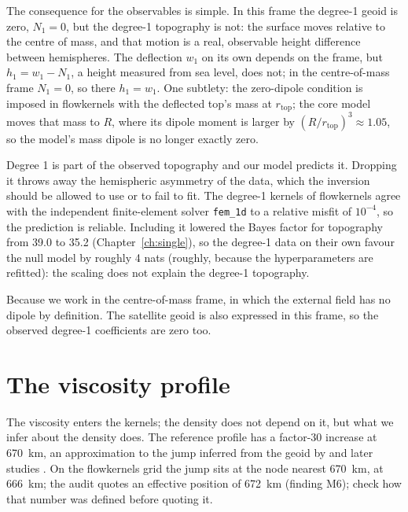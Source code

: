 The consequence for the observables is simple.
In this frame the degree-1 geoid is zero, $N_1=0$, but the degree-1 topography is not: the surface moves relative to the centre of mass, and that motion is a real, observable height difference between hemispheres.
The deflection $w_1$ on its own depends on the frame, but $h_1 = w_1 - N_1$, a height measured from sea level, does not; in the centre-of-mass frame $N_1=0$, so there $h_1=w_1$.
One subtlety: the zero-dipole condition is imposed in flowkernels with the deflected top's mass at $r_{\mathrm{top}}$; the core model moves that mass to $R$, where its dipole moment is larger by $(R/r_{\mathrm{top}})^3\approx1.05$, so the model's mass dipole is no longer exactly zero.

\begin{defence}
\A Degree 1 is part of the observed topography and our model predicts it.
Dropping it throws away the hemispheric asymmetry of the data, which the inversion should be allowed to use or to fail to fit.
The degree-1 kernels of flowkernels agree with the independent finite-element solver \texttt{fem\_1d} to a relative misfit of $10^{-4}$, so the prediction is reliable.
Including it lowered the Bayes factor for topography from 39.0 to 35.2 (Chapter~\ref{ch:single}), so the degree-1 data on their own favour the null model by roughly 4 nats (roughly, because the hyperparameters are refitted): the scaling does not explain the degree-1 topography.

\A Because we work in the centre-of-mass frame, in which the external field has no dipole by definition.
The satellite geoid is also expressed in this frame, so the observed degree-1 coefficients are zero too.
\end{defence}

\section{The viscosity profile}

The viscosity enters the kernels; the density does not depend on it, but what we infer about the density does.
The reference profile has a factor-30 increase at \qty{670}{km}, an approximation to the jump inferred from the geoid by \citet{hager_lower_1985} and later studies \citep{king_masters_1992,rudolph_2015}.
On the flowkernels grid the jump sits at the node nearest \qty{670}{km}, at \qty{666}{km}; the audit quotes an effective position of \qty{672}{km} (finding M6); check how that number was defined before quoting it.

